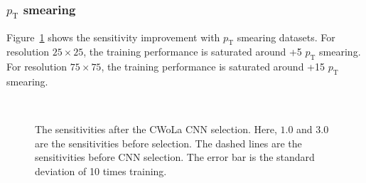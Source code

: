 \documentclass[12pt]{article}
\begin{document}
		\subsubsection{\texorpdfstring{$p_{\mathrm{T}}$}{pT} smearing}%
		\label{subs:pt_smearing}
			Figure~\ref{fig:sensitivity_improvement_origin_pt_aug_SB_1_3} shows the sensitivity improvement with $p_\text{T}$ smearing datasets. For resolution $25\times 25$, the training performance is saturated around +5 $p_{\text{T}}$ smearing. For resolution $75\times 75$, the training performance is saturated around +15 $p_{\text{T}}$ smearing.
			\begin{figure}[htpb]
				\centering
				 \\
				\caption{The sensitivities after the CWoLa CNN selection. Here, $1.0$ and $3.0$ are the sensitivities before selection. The dashed lines are the sensitivities before CNN selection. The error bar is the standard deviation of 10 times training.}
				\label{fig:sensitivity_improvement_origin_pt_aug_SB_1_3}
			\end{figure}
\end{document}
